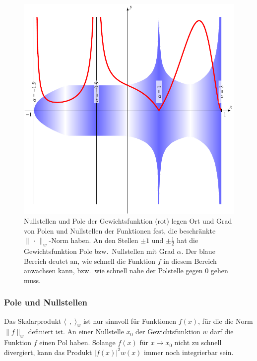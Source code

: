 \begin{figure}
\centering
\includegraphics{chapters/070-orthogonalitaet/images/weight.pdf}
\caption{Nullstellen und Pole der Gewichtsfunktion (rot) legen Ort
und Grad von Polen und Nullstellen der Funktionen fest, die beschränkte
$\|\,\cdot\,\|_w$-Norm haben.
An den Stellen $\pm 1$ und $\pm\frac12$ hat die Gewichtsfunktion
Pole bzw.~Nullstellen mit Grad $\alpha$.
Der blaue Bereich deutet an, wie schnell die Funktion $f$ in diesem
Bereich anwachsen kann, bzw.~wie schnell nahe der Polstelle gegen $0$
gehen muss.
\label{buch:orthogonalitaet:fig:gewicht}}
\end{figure}
%
%
\subsubsection{Pole und Nullstellen
\label{buch:orthogonal:pole-und-nullstellen}}
Das Skalarprodukt $\langle\,\;,\;\rangle_w$ ist nur sinnvoll
für Funktionen $f(x)$, für die die Norm $\|f\|_w$ definiert ist.
An einer Nullstelle $x_0$ der Gewichtsfunktion $w$ darf die Funktion $f$ 
einen Pol haben. 
Solange $f(x)$ für $x\to x_0$ nicht zu schnell divergiert, kann
das Produkt $|f(x)|^2 w(x)$ immer noch integrierbar sein.

